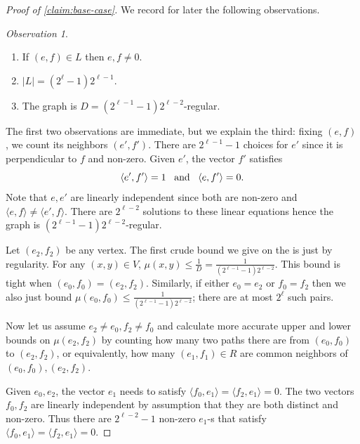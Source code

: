 \documentclass[10pt,a4paper]{article}
\newcommand{\prettyref}[1]{\cref{#1}}
\theoremstyle{definition}
\theoremstyle{remark}
\newtheorem{observation}[theorem]{Observation}
\newcommand{\iprod}[1]{\langle#1\rangle}
\newcommand{\ve}{\;\hbox{and}\;}
\renewcommand{\leq}{\leqslant}
\numberwithin{equation}{section}
\let\pref=\prettyref
\begin{document}
\begin{proof}[Proof of \pref{claim:base-case}]
    \medskip
    
    We record for later the following observations.
    \begin{observation}~ \label{obs:basic-facts-about-base-case}
        \begin{enumerate}
            \item If \((e,f) \in L\) then \(e,f \ne 0\).
            \item \(|L| = (2^\ell-1)2^{\ell-1}\).
            \item The graph is \(D=(2^{\ell-1}-1)2^{\ell-2}\)-regular.
        \end{enumerate}
    \end{observation}
    The first two observations are immediate, but we explain the third: fixing \((e,f)\), we count its neighbors \((e',f')\). There are \(2^{\ell-1}-1\) choices for \(e'\) since it is perpendicular to \(f\) and non-zero. Given \(e'\), the vector \(f'\) satisfies \[\iprod{e',f'}=1 \; \; \ve \; \; \iprod{e,f'}=0.\]
    Note that \(e,e'\) are linearly independent since both are non-zero and \(\iprod{e,f} \ne \iprod{e',f}\). There are \(2^{\ell-2}\) solutions to these linear equations hence the graph is \((2^{\ell-1}-1)2^{\ell-2}\)-regular. 

    \medskip
    
    Let \((e_2,f_2)\) be any vertex. The first crude bound we give on the is just by regularity. For any \((x,y) \in V\), \(\mu(x,y) \leq \frac{1}{D} = \frac{1}{(2^{\ell-1}-1)2^{\ell-2}}\). This bound is tight when \((e_0,f_0) = (e_2,f_2)\). Similarly, if either \(e_0 = e_2\) or \(f_0 = f_2\) then we also just bound \(\mu(e_0,f_0) \leq \frac{1}{(2^{\ell-1}-1)2^{\ell-2}}\); there are at most \(2^{\ell}\) such pairs.
    
    Now let us assume \(e_2 \ne e_0, f_2 \ne f_0\) and calculate more accurate upper and lower bounds on \(\mu(e_2,f_2)\) by counting how many two paths there are from \((e_0,f_0)\) to \((e_2,f_2)\), or equivalently, how many \((e_1,f_1) \in R\) are common neighbors of \((e_0,f_0),(e_2,f_2)\).
    
    Given \(e_0,e_2\), the vector \(e_1\) needs to satisfy \(\iprod{f_0,e_1}=\iprod{f_2,e_1}=0\). The two vectors \(f_0,f_2\) are linearly independent by assumption that they are both distinct and non-zero. Thus there are \(2^{\ell-2}-1\) non-zero \(e_1\)-s that satisfy \(\iprod{f_0,e_1}=\iprod{f_2,e_1}=0\). 
    

\end{proof}
\end{document}
